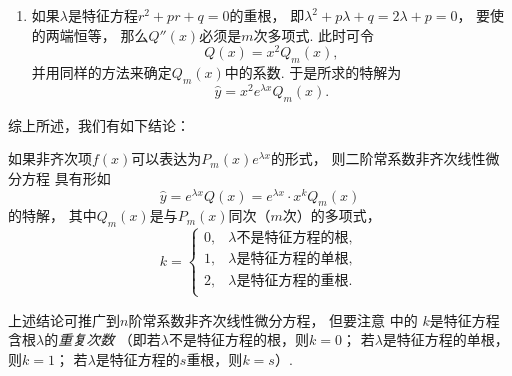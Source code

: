 \begin{enumerate}
	\item 如果\(\lambda\)是特征方程\(r^2+pr+q=0\)的重根，
	即\(\lambda^2+p\lambda+q=2\lambda+p=0\)，
	要使  的两端恒等，
	那么\(Q''(x)\)必须是\(m\)次多项式.
	此时可令\begin{equation*}
		Q(x) = x^2 Q_m(x),
	\end{equation*}
	并用同样的方法来确定\(Q_m(x)\)中的系数.
	于是所求的特解为\begin{equation}
		\hat{y} = x^2 e^{\lambda x} Q_m(x).
	\end{equation}
\end{enumerate}

综上所述，我们有如下结论：
\begin{proposition}
如果非齐次项\(f(x)\)可以表达为\(P_m(x) e^{\lambda x}\)的形式，
则二阶常系数非齐次线性微分方程 
具有形如\begin{equation}\label{equation:微分方程.二阶常系数齐次线性微分方程.特解1}
	\hat{y} = e^{\lambda x} Q(x)
	= e^{\lambda x} \cdot x^k Q_m(x)
\end{equation}的特解，
其中\(Q_m(x)\)是与\(P_m(x)\)同次（\(m\)次）的多项式，\begin{equation*}
	k = \left\{ \begin{array}{ll}
		0, & \text{\(\lambda\)不是特征方程的根}, \\
		1, & \text{\(\lambda\)是特征方程的单根}, \\
		2, & \text{\(\lambda\)是特征方程的重根}. \\
	\end{array} \right.
\end{equation*}
\end{proposition}

上述结论可推广到\(n\)阶常系数非齐次线性微分方程，
但要注意  中的
\(k\)是特征方程含根\(\lambda\)的\emph{重复次数}
（即若\(\lambda\)不是特征方程的根，则\(k=0\)；
若\(\lambda\)是特征方程的单根，则\(k=1\)；
若\(\lambda\)是特征方程的\(s\)重根，则\(k=s\)）.

